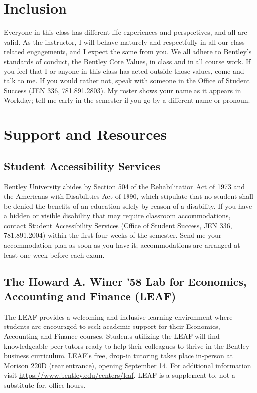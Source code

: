 \documentclass[11pt,letterpaper]{article}
\begin{document}
\section*{Inclusion}

Everyone in this class has different life experiences and perspectives, and all are valid. As the instructor, I will behave maturely and respectfully in all our class-related engagements, and I expect the same from you. We all adhere to Bentley's standards of conduct, the \href{https://www.bentley.edu/about/mission-and-values}{Bentley Core Values}, in class and in all course work. If you feel that I or anyone in this class has acted outside those values, come and talk to me. If you would rather not, speak with someone in the Office of Student Success (JEN 336, 781.891.2803). My roster shows your name as it appears in Workday; tell me early in the semester if you go by a different name or pronoun.

\section*{Support and Resources}

\subsection*{Student Accessibility Services}
Bentley University abides by Section 504 of the Rehabilitation Act of 1973 and the Americans with Disabilities Act of 1990, which stipulate that no student shall be denied the benefits of an education solely by reason of a disability. If you have a hidden or visible disability that may require classroom accommodations, contact \href{https://www.bentley.edu/offices/student-accessibility-services}{Student Accessibility Services} (Office of Student Success, JEN 336, 781.891.2004) within the first four weeks of the semester. Send me your accommodation plan as soon as you have it; accommodations are arranged at least one week before each exam.

\subsection*{The Howard A. Winer '58 Lab for Economics, Accounting and Finance (LEAF)}
The LEAF provides a welcoming and inclusive learning environment where students are encouraged to seek academic support for their Economics, Accounting and Finance courses. Students utilizing the LEAF will find knowledgeable peer tutors ready to help their colleagues to thrive in the Bentley business curriculum. LEAF's free, drop-in tutoring takes place in-person at Morison 220D (rear entrance), opening September 14. For additional information visit \url{https://www.bentley.edu/centers/leaf}. LEAF is a supplement to, not a substitute for, office hours.
\end{document}
